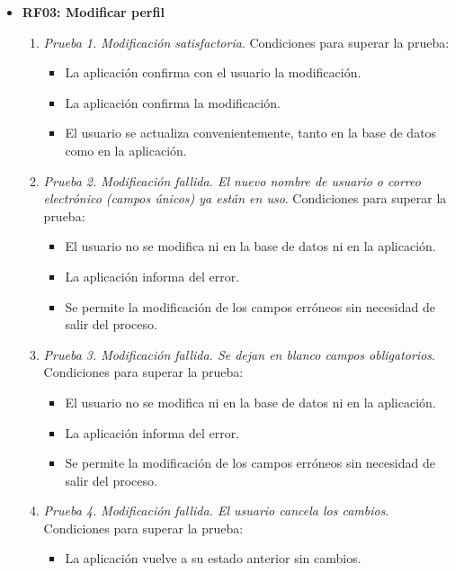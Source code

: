 \begin{itemize}
	\item \textbf{RF03: Modificar perfil}
	\begin{enumerate}
		\item \textit{Prueba 1. Modificación satisfactoria}. Condiciones para superar la prueba:
		\begin{itemize}
			\item La aplicación confirma con el usuario la modificación.
			\item La aplicación confirma la modificación.
			\item El usuario se actualiza convenientemente, tanto en la base de datos como en la aplicación.
		\end{itemize}
		\item \textit{Prueba 2. Modificación fallida. El nuevo nombre de usuario o correo electrónico (campos únicos) ya están en uso}. Condiciones para superar la prueba:
		\begin{itemize}
			\item El usuario no se modifica ni en la base de datos ni en la aplicación.
			\item La aplicación informa del error.
			\item Se permite la modificación de los campos erróneos sin necesidad de salir del proceso.
		\end{itemize}
		\item \textit{Prueba 3. Modificación fallida. Se dejan en blanco campos obligatorios}. Condiciones para superar la prueba:
		\begin{itemize}
			\item El usuario no se modifica ni en la base de datos ni en la aplicación.
			\item La aplicación informa del error.
			\item Se permite la modificación de los campos erróneos sin necesidad de salir del proceso.
		\end{itemize}
		\item \textit{Prueba 4. Modificación fallida. El usuario cancela los cambios}. Condiciones para superar la prueba:
		\begin{itemize}
			\item La aplicación vuelve a su estado anterior sin cambios.
		\end{itemize}
	\end{enumerate}
	

\end{itemize}
